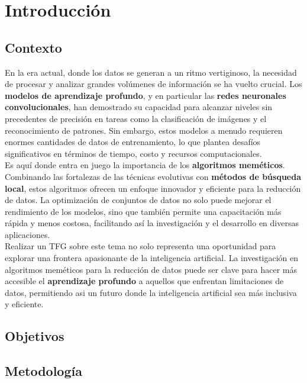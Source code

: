 \chapter{Introducción}\label{ch:introduccion}

\section{Contexto}\label{sec:contexto}
En la era actual, donde los datos se generan a un ritmo vertiginoso, la necesidad de procesar y analizar grandes
volúmenes de información se ha vuelto crucial.
Los \textbf{modelos de aprendizaje profundo}, y en particular las \textbf{redes neuronales convolucionales}, han
demostrado su capacidad para alcanzar niveles sin precedentes de precisión en tareas como la clasificación de imágenes
y el reconocimiento de patrones.
Sin embargo, estos modelos a menudo requieren enormes cantidades de datos de entrenamiento, lo que plantea desafíos
significativos en términos de tiempo, costo y recursos computacionales. \\[6pt]

Es aquí donde entra en juego la importancia de los \textbf{algoritmos meméticos}.
Combinando las fortalezas de las técnicas evolutivas con \textbf{métodos de búsqueda local}, estos algoritmos ofrecen
un enfoque innovador y eficiente para la reducción de datos.
La optimización de conjuntos de datos no solo puede mejorar el rendimiento de los modelos, sino que también permite una
capacitación más rápida y menos costosa, facilitando así la investigación y el desarrollo en diversas aplicaciones.
\\[6pt]

Realizar un TFG sobre este tema no solo representa una oportunidad para explorar una frontera apasionante de la
inteligencia artificial.
La investigación en algoritmos meméticos para la reducción de datos puede ser clave para hacer más accesible el
\textbf{aprendizaje profundo} a aquellos que enfrentan limitaciones de datos, permitiendo asi un futuro donde la
inteligencia artificial sea más inclusiva y eficiente. \\[6pt]

\section{Objetivos}\label{sec:objetivos}
\section{Metodología}\label{sec:metodologia}
